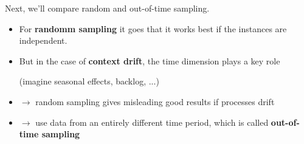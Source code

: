 Next, we'll compare random and out-of-time sampling.
\begin{itemize}
  \item For \textbf{randomm sampling} it goes that it works best if the instances are independent.
  \item But in the case of \textbf{context drift}, the time dimension plays a key role \begin{note}(imagine seasonal effects, backlog, ...)\end{note}
  \item $\rightarrow$ random sampling gives misleading good results if processes drift
  \item $\rightarrow$ use data from an entirely different time period, which is called \textbf{out-of-time sampling}
\end{itemize}

